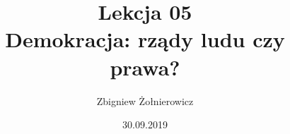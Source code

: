 \documentclass[a4paper]{article}
\begin{document}
\title{{\huge Lekcja 05} \\
{\large Demokracja: rządy ludu czy prawa?}}
\author{Zbigniew Żołnierowicz}
\date{30.09.2019}
\maketitle
\end{document}
